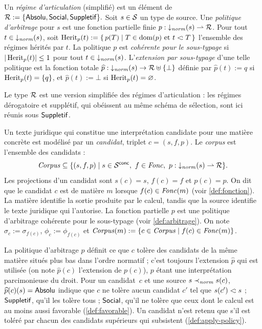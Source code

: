 \documentclass[review]{jflart}
\begin{document}
\begin{defi}\label{def:arbitrage}
Un \emph{régime d'articulation} (simplifié) est un élément de
\(
\mathcal{R}:= \{\mathsf{Absolu}, \mathsf{Social}, \mathsf{Suppletif}\}.
\)
Soit \(s \in\mathcal{S}\) un type de source. Une \emph{politique d'arbitrage} pour
\(s\) est une fonction partielle finie \(p : \mathop{\downarrow_{\mathit{norm}}}(s)\rightharpoonup \mathcal{R}\).
Pour tout \(t \in \mathop{\downarrow_{\mathit{norm}}}(s)\), soit
\(\operatorname{Herit}_{p}(t):=\{\,p(T)\mid T\in\operatorname{dom}(p)\text{ et }t\mathrel{<\!:} T\,\}\)
l'ensemble des régimes hérités par \(t\). La politique \(p\) est
\emph{cohérente pour le sous-typage} si \(|\operatorname{Herit}_{p}(t)|\leq 1\) pour tout
\(t\in\mathop{\downarrow_{\mathit{norm}}}(s)\). L'\emph{extension par sous-typage} d'une telle
politique est la fonction totale
\(\widehat{p}:\mathop{\downarrow_{\mathit{norm}}}(s)\to\mathcal{R}\uplus\{\bot\}\) définie par
\(\widehat{p}(t):=q\) si \(\operatorname{Herit}_{p}(t)=\{q\}\), et \(\widehat{p}(t):=\bot\)
si \(\operatorname{Herit}_{p}(t)=\varnothing\).
\end{defi}

Le type \(\mathcal{R}\) est une version simplifiée des régimes d'articulation : les
régimes dérogatoire et supplétif, qui obéissent au même schéma de sélection,
sont ici réunis sous \(\mathsf{Suppletif}\).

\begin{defi}\label{def:candidat}
Un texte juridique qui constitue une interprétation candidate pour une matière concrète
est modélisé par un \emph{candidat}, triplet \(c=(s,f,p)\). Le
\emph{corpus} est l'ensemble des candidats :
\[
 \Cand \subseteq \{(s,f,p) \mid s\in\CSource,\ f\in\Fun,\ p: \normdown(s)\rightharpoonup \Policy \}.
\]
Les projections d'un candidat sont \(s(c)=s\), \(f(c)=f\) et \(p(c)=p\). On dit que le
candidat \(c\) est de matière \(m\) lorsque \(f(c)\in\mathit{Fonc}(m)\)
(voir \autoref{def:fonction}). La matière identifie la sortie produite par
le calcul, tandis que la source identifie le texte juridique qui l'autorise.
La fonction partielle \(p\) est une politique d'arbitrage cohérente pour le
sous-typage (voir \autoref{def:arbitrage}). On note
\(\sigma_c:=\sigma_{f(c)}\), \(\phi_c:=\phi_{f(c)}\) et
\(\mathit{Corpus}(m):=\{c\in\mathit{Corpus}\mid f(c)\in\mathit{Fonc}(m)\}\).
\end{defi}

La politique d'arbitrage \(p\) définit ce que \(c\) tolère des candidats de
la même matière situés plus bas dans l'ordre normatif ; c'est toujours
l'extension \(\widehat p\) qui est utilisée (on note \(\widehat p(c)\)
l'extension de \(p(c)\)), \(p\) étant une interprétation parcimonieuse du
droit. Pour un candidat~\(c\) et une source \(s\prec_{\mathit{norm}} s(c)\),
\(\widehat p(c)(s)=\mathsf{Absolu}\) indique que \(c\) ne tolère aucun candidat
\(c'\) tel que \(s(c')\mathrel{<\!:} s\) ; \(\mathsf{Suppletif}\), qu'il les tolère
tous ; \(\mathsf{Social}\), qu'il ne tolère que ceux dont le calcul est au moins
aussi favorable (\autoref{def:favorable}). Un candidat n'est retenu que s'il
est toléré par chacun des candidats supérieurs qui subsistent
(\autoref{def:apply-policy}).
\end{document}
